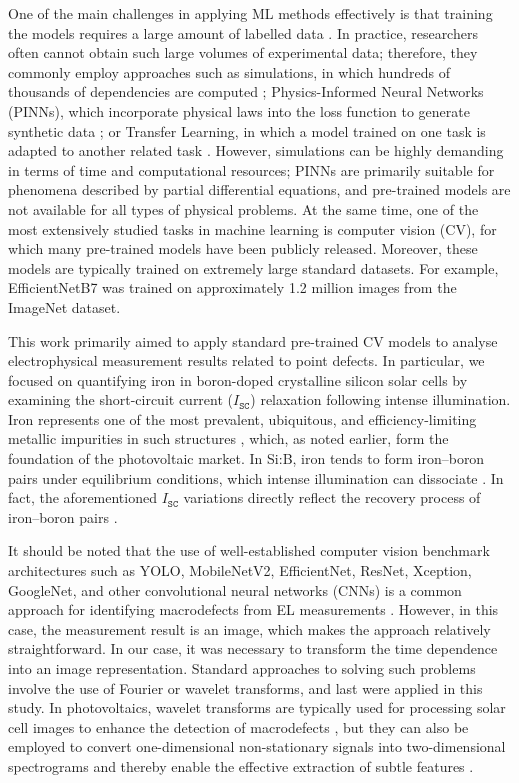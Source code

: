 \documentclass[10pt]{iopart}
\begin{document}
One of the main challenges in applying ML methods effectively is that training the models requires a large amount of labelled data \cite{Buratti2024}.
In practice, researchers often cannot obtain such large volumes of experimental data; 
therefore, they commonly employ approaches such as simulations, 
in which hundreds of thousands of dependencies are computed \cite{Wang2024a, Buratti2022, Buratti2020a, Olikh2025MSEB, Olikh2025SE}; 
Physics-Informed Neural Networks (PINNs), which incorporate physical laws into the loss function to generate synthetic data \cite{Wang2024b, Li2025}; 
or Transfer Learning, in which a model trained on one task is adapted to another related task \cite{Kaya2019, Kim2023}.
However, simulations can be highly demanding in terms of time and computational resources; PINNs are primarily suitable for phenomena described by partial differential equations, and pre-trained models are not available for all types of physical problems.
At the same time, one of the most extensively studied tasks in machine learning is computer vision (CV), 
for which many pre-trained models have been publicly released. 
Moreover, these models are typically trained on extremely large standard datasets. 
For example, EfficientNetB7 was trained on approximately 1.2 million images from the ImageNet dataset.

This work primarily aimed to apply standard pre-trained CV models to analyse electrophysical measurement results related to point defects.
In particular, we focused on quantifying iron in boron-doped crystalline silicon solar cells by examining the short-circuit current 
($I_\mathtt{SC}$) relaxation following intense illumination.
Iron represents one of the most prevalent, ubiquitous, and efficiency-limiting metallic impurities in such structures \cite{Buonassisi2006, IronSC}, 
which, as noted earlier, form the foundation of the photovoltaic market.
In Si:B, iron tends to form iron–boron pairs under equilibrium conditions, which intense illumination can dissociate \cite{Kimerling1983, FeBAssJAP2014}.
In fact, the aforementioned $I_\mathtt{SC}$ variations directly reflect the recovery process of iron–boron pairs \cite{Olikh2021JAP}.


It should be noted that the use of well-established computer vision benchmark architectures such 
as YOLO, MobileNetV2, EfficientNet, ResNet, Xception, GoogleNet, and other convolutional neural networks (CNNs) is a common approach for identifying macrodefects from EL
measurements \cite{Liu2024a, Li2024a, Jia2024, Otamendi2021, Chen2022, AlOtum2024, Abdelsattar2025, tella2025}. 
However, in this case, the measurement result is an image, which makes the approach relatively straightforward.
In our case, it was necessary to transform the time dependence into an image representation.
Standard approaches to solving such problems involve the use of Fourier or wavelet transforms, and last were applied in this study.
In photovoltaics, wavelet transforms are typically used for processing solar cell images to enhance the detection of
macrodefects \cite{Li2012, Rosa2024}, but they can also be employed to convert one-dimensional non-stationary signals into two-dimensional spectrograms and thereby enable the effective extraction of subtle features \cite{Vinit2020}.
\end{document}
